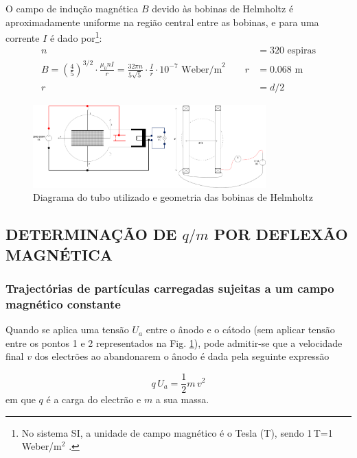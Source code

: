 \documentclass[a4paper,twoside,12pt]{article}      %
\begin{document}
O campo de indução magnética $B$ devido às bobinas de Helmholtz é aproximadamente uniforme na região central entre as bobinas, e para uma corrente $I$ é dado por\footnote{No sistema SI, a unidade de campo magnético é o Tesla (T), sendo 1\,T=1\,Weber/m$^{2}$ .}:
\begin{align}
	\label{eq:helmotz}
	 n &= 320\textrm{ espiras} \nonumber \\ 
B = \left(\frac{4}{5}\right)^{3/2} \cdot \frac{\mu_0 n I}{r} =  \frac{32 \pi n }{5 \sqrt{5}} \cdot \frac{I}{r} \cdot 10^{-7}\textrm{ Weber/m}^{2}
 \qquad  r  &= 0.068\textrm{ m} \\
r  &= d/2 \nonumber
\end{align}

\begin{figure}
	[h]  \centering 
	\includegraphics[width=0.8\textwidth]{fig5-TuboTL} 
	\caption{Diagrama do tubo utilizado e geometria das bobinas de Helmholtz \label{fig:TL}} 
\end{figure}

\subsection{\sf DETERMINAÇÃO DE $q/m$ POR  DEFLEXÃO MAGNÉTICA}
\subsubsection{\sf Trajectórias de partículas carregadas sujeitas a um campo magnético constante}
Quando se aplica uma tensão $U_a$ entre o ânodo e o cátodo (sem aplicar tensão entre os pontos 1 e 2 representados na Fig. \ref{fig:TL}), pode admitir-se que a velocidade final $v$ dos electrões ao abandonarem o ânodo é dada pela seguinte expressão 

\begin{equation}
	\label{eq:encin}
q\, U_a = \frac{1}{2} m \, v^2
\end{equation}
em que $q$  é a carga do electrão e $m$ a sua massa.
\end{document}
